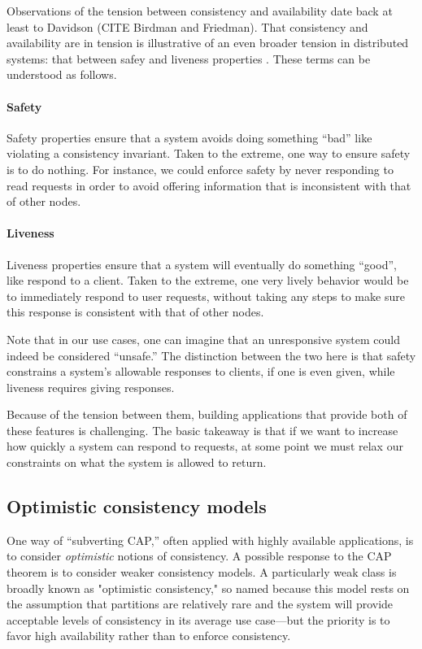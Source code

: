 Observations of the tension between consistency and availability date
back at least to Davidson \cite{} (CITE Birdman and Friedman). That
consistency and availability are in tension is illustrative of an even
broader tension in distributed systems: that between safey and
liveness properties \cite{}. These terms can be understood as follows.

\paragraph{Safety}
Safety properties ensure that a system avoids doing something ``bad''
like violating a consistency invariant. Taken to the extreme, one way
to ensure safety is to do nothing. For instance, we could enforce
safety by never responding to read requests in order to avoid offering
information that is inconsistent with that of other nodes.

\paragraph{Liveness}
Liveness properties ensure that a system will eventually do something
``good'', like respond to a client. Taken to the extreme, one very
lively behavior would be to immediately respond to user requests,
without taking any steps to make sure this response is consistent with
that of other nodes.

Note that in our use cases, one can imagine that an unresponsive
system could indeed be considered ``unsafe.'' The distinction between
the two here is that safety constrains a system's allowable responses
to clients, if one is even given, while liveness requires giving
responses.

Because of the tension between them, building applications that
provide both of these features is challenging. The basic takeaway is
that if we want to increase how quickly a system can respond to
requests, at some point we must relax our constraints on what the
system is allowed to return.

\subsection{Optimistic consistency models}
One way of ``subverting CAP,'' often applied with highly available
applications, is to consider \emph{optimistic} notions of consistency.  A
possible response to the CAP theorem is to consider weaker consistency
models. A particularly weak class is broadly known as "optimistic
consistency," so named because this model rests on the assumption that
partitions are relatively rare and the system will provide acceptable
levels of consistency in its average use case---but the priority is to
favor high availability rather than to enforce consistency.

